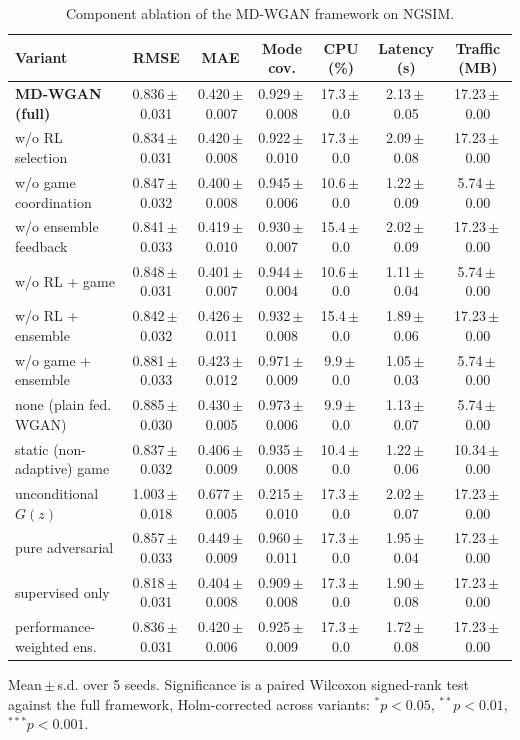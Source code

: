 \begin{table}[t]
\centering
\caption{Component ablation of the MD-WGAN framework on NGSIM.}
\label{tab:ablation}
\begin{tabular}{lcccccc}
\toprule
Variant & RMSE & MAE & Mode cov. & CPU (\%) & Latency (s) & Traffic (MB) \\
\midrule
\textbf{MD-WGAN (full)} & 0.836\,$\pm$\,0.031 & 0.420\,$\pm$\,0.007 & 0.929\,$\pm$\,0.008 & 17.3\,$\pm$\,0.0 & 2.13\,$\pm$\,0.05 & 17.23\,$\pm$\,0.00 \\
w/o RL selection & 0.834\,$\pm$\,0.031 & 0.420\,$\pm$\,0.008 & 0.922\,$\pm$\,0.010 & 17.3\,$\pm$\,0.0 & 2.09\,$\pm$\,0.08 & 17.23\,$\pm$\,0.00 \\
w/o game coordination & 0.847\,$\pm$\,0.032 & 0.400\,$\pm$\,0.008 & 0.945\,$\pm$\,0.006 & 10.6\,$\pm$\,0.0 & 1.22\,$\pm$\,0.09 & 5.74\,$\pm$\,0.00 \\
w/o ensemble feedback & 0.841\,$\pm$\,0.033 & 0.419\,$\pm$\,0.010 & 0.930\,$\pm$\,0.007 & 15.4\,$\pm$\,0.0 & 2.02\,$\pm$\,0.09 & 17.23\,$\pm$\,0.00 \\
w/o RL + game & 0.848\,$\pm$\,0.031 & 0.401\,$\pm$\,0.007 & 0.944\,$\pm$\,0.004 & 10.6\,$\pm$\,0.0 & 1.11\,$\pm$\,0.04 & 5.74\,$\pm$\,0.00 \\
w/o RL + ensemble & 0.842\,$\pm$\,0.032 & 0.426\,$\pm$\,0.011 & 0.932\,$\pm$\,0.008 & 15.4\,$\pm$\,0.0 & 1.89\,$\pm$\,0.06 & 17.23\,$\pm$\,0.00 \\
w/o game + ensemble & 0.881\,$\pm$\,0.033 & 0.423\,$\pm$\,0.012 & 0.971\,$\pm$\,0.009 & 9.9\,$\pm$\,0.0 & 1.05\,$\pm$\,0.03 & 5.74\,$\pm$\,0.00 \\
none (plain fed. WGAN) & 0.885\,$\pm$\,0.030 & 0.430\,$\pm$\,0.005 & 0.973\,$\pm$\,0.006 & 9.9\,$\pm$\,0.0 & 1.13\,$\pm$\,0.07 & 5.74\,$\pm$\,0.00 \\
static (non-adaptive) game & 0.837\,$\pm$\,0.032 & 0.406\,$\pm$\,0.009 & 0.935\,$\pm$\,0.008 & 10.4\,$\pm$\,0.0 & 1.22\,$\pm$\,0.06 & 10.34\,$\pm$\,0.00 \\
unconditional $G(z)$ & 1.003\,$\pm$\,0.018 & 0.677\,$\pm$\,0.005 & 0.215\,$\pm$\,0.010 & 17.3\,$\pm$\,0.0 & 2.02\,$\pm$\,0.07 & 17.23\,$\pm$\,0.00 \\
pure adversarial & 0.857\,$\pm$\,0.033 & 0.449\,$\pm$\,0.009 & 0.960\,$\pm$\,0.011 & 17.3\,$\pm$\,0.0 & 1.95\,$\pm$\,0.04 & 17.23\,$\pm$\,0.00 \\
supervised only & 0.818\,$\pm$\,0.031 & 0.404\,$\pm$\,0.008 & 0.909\,$\pm$\,0.008 & 17.3\,$\pm$\,0.0 & 1.90\,$\pm$\,0.08 & 17.23\,$\pm$\,0.00 \\
performance-weighted ens. & 0.836\,$\pm$\,0.031 & 0.420\,$\pm$\,0.006 & 0.925\,$\pm$\,0.009 & 17.3\,$\pm$\,0.0 & 1.72\,$\pm$\,0.08 & 17.23\,$\pm$\,0.00 \\
\bottomrule
\end{tabular}
\begin{flushleft}\footnotesize
Mean\,$\pm$\,s.d. over 5 seeds. Significance is a paired Wilcoxon signed-rank test against the full framework, Holm-corrected across variants: $^{*}p<0.05$, $^{**}p<0.01$, $^{***}p<0.001$.
\end{flushleft}
\end{table}
